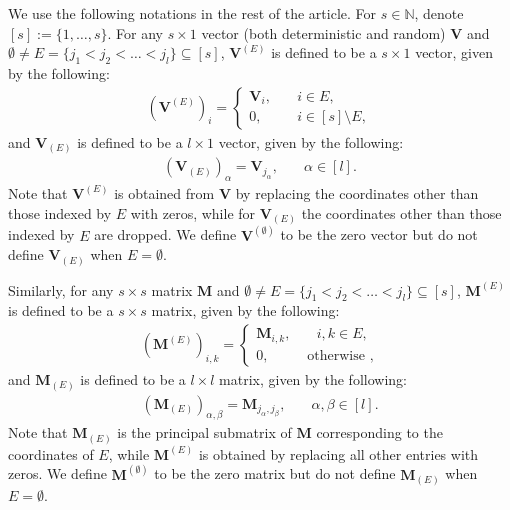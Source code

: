 \documentclass[12pt]{amsart}
\theoremstyle{plain}
\theoremstyle{remark}
\numberwithin{equation}{section}
\begin{document}
We use the following notations in the rest of the article. For $s \in \mathbb{N}$, denote $[s] := \{1, \ldots, s\}$. For any $s\times 1$ vector (both deterministic and random) $\boldsymbol{V}$ and $\emptyset \neq E = \{j_1 < j_2 < \ldots < j_l\} \subseteq [s]$, $\boldsymbol{V}^{(E)}$ is defined to be a $s\times 1$ vector, given by the following: 
\begin{align}\label{eq:not1}
    \left(\boldsymbol{V}^{(E)}\right)_i = \begin{cases}
        \boldsymbol{V}_i, &\quad i \in E, \\
        0, &\quad i \in [s]\setminus E,
    \end{cases}
\end{align}
and $\boldsymbol{V}_{(E)}$ is defined to be a $l\times 1$ vector, given by the following: 
\begin{align*}
    \left(\boldsymbol{V}_{(E)}\right)_{\alpha} = 
        \boldsymbol{V}_{j_{\alpha}}, &\quad \alpha \in [l].
\end{align*}
Note that $\boldsymbol{V}^{(E)}$ is obtained from $\boldsymbol{V}$ by replacing the coordinates other than those indexed by $E$ with zeros, while for $\boldsymbol{V}_{(E)}$ the coordinates other than those indexed by $E$ are dropped. We define $\boldsymbol{V}^{(\emptyset)}$ to be the zero vector but do not define $\boldsymbol{V}_{(E)}$ when $E=\emptyset$.

Similarly, for any $s\times s$ matrix $\boldsymbol{M}$ and $\emptyset \neq E = \{j_1 < j_2 < \ldots < j_l\} \subseteq [s]$, $\boldsymbol{M}^{(E)}$ is defined to be a $s\times s$ matrix, given by the following: 
\begin{align*}
    \left(\boldsymbol{M}^{(E)}\right)_{i,k} = \begin{cases}
        \boldsymbol{M}_{i,k}, &\quad i,k \in E, \\
        0, &\text{ otherwise },
    \end{cases}
\end{align*}
and $\boldsymbol{M}_{(E)}$ is defined to be a $l\times l$ matrix, given by the following: 
\begin{align*}
    \left(\boldsymbol{M}_{(E)}\right)_{\alpha,\beta} = 
        \boldsymbol{M}_{j_{\alpha},j_{\beta}}, &\quad \alpha,\beta \in [l].
\end{align*}
Note that $\boldsymbol{M}_{(E)}$ is the principal submatrix of $\boldsymbol{M}$ corresponding to the coordinates of $E$, while $\boldsymbol{M}^{(E)}$ is obtained by replacing all other entries with zeros. We define $\boldsymbol{M}^{(\emptyset)}$ to be the zero matrix but do not define $\boldsymbol{M}_{(E)}$ when $E=\emptyset$.
\end{document}
